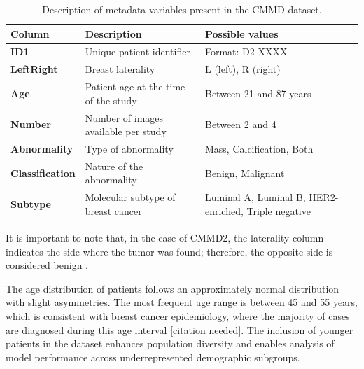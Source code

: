 \documentclass[a4paper,10pt]{book}
\begin{document}
\begin{table}[h]
	\caption{Description of metadata variables present in the CMMD dataset.}
	\centering
	\begin{tabular}{>{\bfseries}l p{5cm} p{6cm}}
		\toprule
		\textbf{Column} & \textbf{Description}                 & \textbf{Possible values}                             \\
		\midrule
		ID1             & Unique patient identifier            & Format: D2-XXXX                                      \\
		LeftRight       & Breast laterality                    & L (left), R (right)                                  \\
		Age             & Patient age at the time of the study & Between 21 and 87 years                              \\
		Number          & Number of images available per study & Between 2 and 4                                      \\
		Abnormality     & Type of abnormality                  & Mass, Calcification, Both                            \\
		Classification  & Nature of the abnormality            & Benign, Malignant                                    \\
		Subtype         & Molecular subtype of breast cancer   & Luminal A, Luminal B, HER2-enriched, Triple negative \\
		\bottomrule
	\end{tabular}

	\label{tab:cmmd2_metadata}
\end{table}

It is important to note that, in the case of CMMD2, the laterality column indicates the side where the tumor was found; therefore, the opposite side is considered benign \cite{cai_online_2023}.

The age distribution of patients follows an approximately normal distribution with slight asymmetries. The most frequent age range is between 45 and 55 years, which is consistent with breast cancer epidemiology, where the majority of cases are diagnosed during this age interval [citation needed]. The inclusion of younger patients in the dataset enhances population diversity and enables analysis of model performance across underrepresented demographic subgroups.
\end{document}
